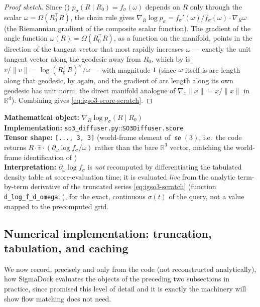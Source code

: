 \documentclass[11pt,a4paper]{report}
\theoremstyle{definition}
\theoremstyle{remark}
\DeclareMathOperator{\so}{\mathfrak{so}}
\newcommand{\RR}{\mathbb R}
\newcommand{\file}[1]{\texttt{#1}}
\newcommand{\pyfunc}[1]{\texttt{#1}}
\newcommand{\shape}[1]{\texttt{[#1]}}
\begin{document}
\begin{proof}[Proof sketch]
Since () $p_\sigma(R\mid R_0)=f_\sigma(\omega)$
depends on $R$ only through the scalar $\omega=\Omega(R_0^\top R)$, the
chain rule gives $\nabla_R\log p_\sigma = f_\sigma'(\omega)/f_\sigma(\omega)\cdot\nabla_R\omega$
(the Riemannian gradient of the composite scalar function). The gradient of
the angle function $\omega(R)=\Omega(R_0^\top R)$, as a function on the
manifold, points in the direction of the tangent vector that most rapidly
increases $\omega$ --- exactly the unit tangent vector along the geodesic
away from $R_0$, which by  is
$v/\|v\|=\log(R_0^\top R)^\vee/\omega$ --- with magnitude $1$ (since $\omega$
itself is arc length along that geodesic, by
 again, and the gradient of arc length along its
own geodesic has unit norm, the direct manifold analogue of
$\nabla_x\|x\|=x/\|x\|$ in $\RR^d$). Combining gives
\eqref{eq:igso3-score-scratch}.
\end{proof}

\begin{codebox}
\textbf{Mathematical object:} $\nabla_R\log p_\sigma(R\mid R_0)$ \\
\textbf{Implementation:} \file{so3\_diffuser.py}::\pyfunc{SO3Diffuser.score} \\
\textbf{Tensor shape:} \shape{..., 3, 3} (world-frame element of $\so(3)$,
i.e.\ the code returns $R\cdot\widehat v\cdot(\partial_\omega\log f_\sigma/\omega)$
rather than the bare $\RR^3$ vector, matching the world-frame
identification of ) \\
\textbf{Interpretation:} $\partial_\omega\log f_\sigma$ is \emph{not}
recomputed by differentiating the tabulated density table at score-evaluation
time; it is evaluated \emph{live} from the analytic term-by-term derivative
of the truncated series \eqref{eq:igso3-scratch} (function
\pyfunc{d\_log\_f\_d\_omega}, ), for the exact,
continuous $\sigma(t)$ of the query, not a value snapped to the
precomputed grid.
\end{codebox}

\subsection{Numerical implementation: truncation, tabulation, and caching}
\label{sec:diff-so3-numerics}

We now record, precisely and only from the code (not reconstructed
analytically), how SigmaDock evaluates the objects of the preceding two
subsections in practice, since  promised this
level of detail and it is exactly the machinery 
will show flow matching does not need.
\end{document}
